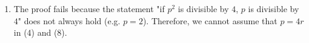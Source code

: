 \documentclass[13pt]{article}
\begin{document}
\begin{enumerate}[label=(\alph*)]
\item The proof fails because the statement "if $p^2$ is divisible by $4$, $p$ is divisible by $4$"
  does not always hold (e.g. $p = 2$). Therefore, we cannot assume that $p = 4r$ in (4) and (8).
\end{enumerate}
\end{document}
